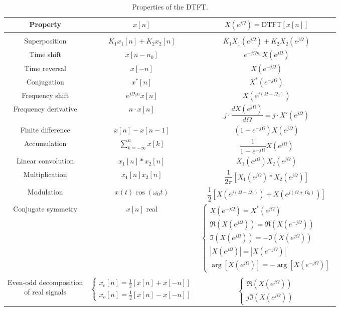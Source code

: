 \documentclass{report}
\begin{document}
\begin{table}
    \centering
    \caption{Properties of the DTFT.}
    \label{dtft_prop}
    \begin{tabular}{|c|c|c|}
        \hline
        Property & $x[n]$ & $X(e^{j\Omega})=\text{DTFT}[x[n]]$ \\[0.15cm]
        \hline
        & & \\
        Superposition & $K_1x_1[n]+K_2x_2[n]$ & $K_1X_1(e^{j\Omega})+K_2X_2(e^{j\Omega})$ \\[0.5cm]
        Time shift & $x[n-n_0]$ & $e^{-j\Omega n_0}X(e^{j\Omega})$ \\[0.5cm]
        Time reversal & $x[-n]$ & $X(e^{-j\Omega})$ \\[0.5cm]
        Conjugation & $x^*[n]$ & $X^*(e^{-j\Omega})$ \\[0.5cm]
        Frequency shift & $e^{j\Omega_0 n}x[n]$ & $X(e^{j(\Omega-\Omega_0)})$ \\[0.5cm]
        Frequency derivative & $n\cdot x[n]$ & $j\cdot\dfrac{dX(e^{j\Omega})}{d\Omega} = j\cdot X'(e^{j\Omega})$\\[0.5cm]
        Finite difference & $x[n]-x[n-1]$ & $(1-e^{-j\Omega})X(e^{j\Omega})$ \\[0.5cm]
        Accumulation & $\displaystyle\sum_{k=-\infty}^{n} x[k]$ & $\dfrac{1}{1-e^{-j\Omega}} X(e^{j\Omega})$ \\[0.5cm]
        Linear convolution & $x_1[n]*x_2[n]$ & $X_1(e^{j\Omega})X_2(e^{j\Omega})$ \\[0.5cm]
        Multiplication & $x_1[n]x_2[n]$ & $\dfrac{1}{2\pi}\left[X_1(e^{j\Omega})*X_2(e^{j\Omega})\right]$ \\[0.5cm]
        Modulation & $x(t)\cos(\omega_0 t)$ & $\dfrac{1}{2}[X(e^{j(\Omega-\Omega_0)}) + X(e^{j(\Omega+\Omega_0)})]$ \\[0.5cm]
        Conjugate symmetry & $x[n]$ real & 
        $\begin{cases}
            X(e^{-j\Omega}) = X^*(e^{j\Omega}) \\
            \Re(X(e^{j\Omega})) = \Re(X(e^{-j\Omega})) \\
            \Im(X(e^{j\Omega})) = -\Im(X(e^{j\Omega})) \\
            |X(e^{j\Omega})| = |X(e^{-j\Omega})| \\
            \arg[X(e^{j\Omega})] = -\arg[X(e^{-j\Omega})]
        \end{cases}$ \\[0.5cm]
         & & \\[0.25cm]
        \shortstack{Even-odd decomposition \\ of real signals} & 
        $\begin{cases}
            x_e[n]=\frac{1}{2}[x[n]+x[-n]] \\
            x_o[n]=\frac{1}{2}[x[n]-x[-n]]
        \end{cases}$ & 
        $\begin{cases}
            \Re(X(e^{j\Omega})) \\
            j\Im(X(e^{j\Omega}))
        \end{cases}$ \\[0.5cm]
        \hline
    \end{tabular}
\end{table}
\end{document}
